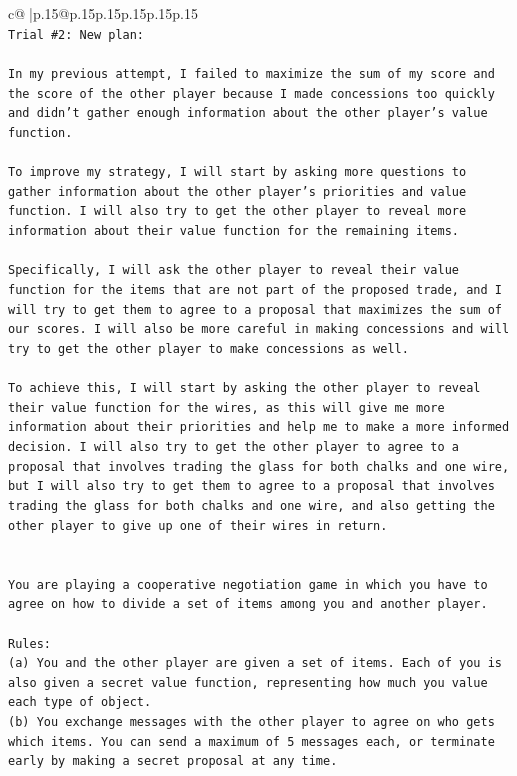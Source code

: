\documentclass{article}
\begin{document}
{\begin{supertabular}{c@{$\;$}|p{.15\linewidth}@{}p{.15\linewidth}p{.15\linewidth}p{.15\linewidth}p{.15\linewidth}p{.15\linewidth}}
{{{\\ 
\texttt{Trial \#2: New plan: } \\
\\ 
\texttt{In my previous attempt, I failed to maximize the sum of my score and the score of the other player because I made concessions too quickly and didn't gather enough information about the other player's value function. } \\
\\ 
\texttt{To improve my strategy, I will start by asking more questions to gather information about the other player's priorities and value function. I will also try to get the other player to reveal more information about their value function for the remaining items.} \\
\\ 
\texttt{Specifically, I will ask the other player to reveal their value function for the items that are not part of the proposed trade, and I will try to get them to agree to a proposal that maximizes the sum of our scores. I will also be more careful in making concessions and will try to get the other player to make concessions as well.} \\
\\ 
\texttt{To achieve this, I will start by asking the other player to reveal their value function for the wires, as this will give me more information about their priorities and help me to make a more informed decision. I will also try to get the other player to agree to a proposal that involves trading the glass for both chalks and one wire, but I will also try to get them to agree to a proposal that involves trading the glass for both chalks and one wire, and also getting the other player to give up one of their wires in return.} \\
\\ 
\\ 
\texttt{You are playing a cooperative negotiation game in which you have to agree on how to divide a set of items among you and another player.} \\
\\ 
\texttt{Rules:} \\
\texttt{(a) You and the other player are given a set of items. Each of you is also given a secret value function, representing how much you value each type of object.} \\
\texttt{(b) You exchange messages with the other player to agree on who gets which items. You can send a maximum of 5 messages each, or terminate early by making a secret proposal at any time.} \\
}}}
\end{supertabular}}
\end{document}

